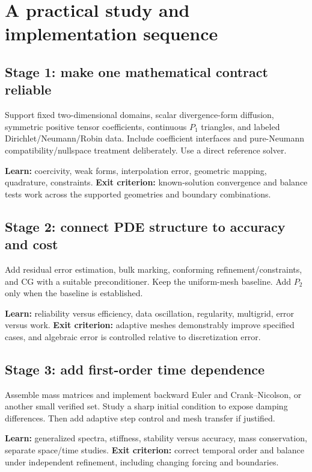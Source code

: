 \documentclass[11pt,a4paper]{article}
\begin{document}
\section{A practical study and implementation sequence}\label{sec:roadmap}
\subsection{Stage 1: make one mathematical contract reliable}
Support fixed two-dimensional domains, scalar divergence-form diffusion, symmetric positive tensor coefficients, continuous $P_1$ triangles, and labeled Dirichlet/Neumann/Robin data. Include coefficient interfaces and pure-Neumann compatibility/nullspace treatment deliberately. Use a direct reference solver.

\textbf{Learn:} coercivity, weak forms, interpolation error, geometric mapping, quadrature, constraints.\quad
\textbf{Exit criterion:} known-solution convergence and balance tests work across the supported geometries and boundary combinations.

\subsection{Stage 2: connect PDE structure to accuracy and cost}
Add residual error estimation, bulk marking, conforming refinement/constraints, and CG with a suitable preconditioner. Keep the uniform-mesh baseline. Add $P_2$ only when the baseline is established.

\textbf{Learn:} reliability versus efficiency, data oscillation, regularity, multigrid, error versus work.\quad
\textbf{Exit criterion:} adaptive meshes demonstrably improve specified cases, and algebraic error is controlled relative to discretization error.

\subsection{Stage 3: add first-order time dependence}
Assemble mass matrices and implement backward Euler and Crank--Nicolson, or another small verified set. Study a sharp initial condition to expose damping differences. Then add adaptive step control and mesh transfer if justified.

\textbf{Learn:} generalized spectra, stiffness, stability versus accuracy, mass conservation, separate space/time studies.\quad
\textbf{Exit criterion:} correct temporal order and balance under independent refinement, including changing forcing and boundaries.
\end{document}

